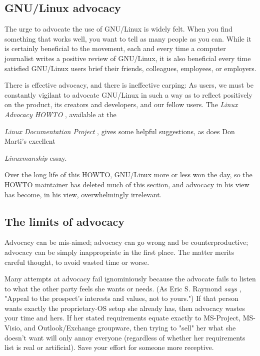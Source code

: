 \documentclass{HOWTO}
\begin{document}
\subsection{GNU/Linux advocacy}

The urge to advocate the use of GNU/Linux is widely felt.  When you find
something that works well, you want to tell as many people as you can.
While it is certainly beneficial to the movement, each and every time a
computer journalist writes a positive review of GNU/Linux, it is also
beneficial every time satisfied GNU/Linux users brief their friends,
colleagues, employees, or employers.

There is effective advocacy, and there is ineffective carping: As 
users, we must be constantly vigilant to advocate GNU/Linux in such a way as
to reflect positively on the product, its creators and developers, and
our fellow users.  The 
\emph{Linux Advocacy HOWTO} \texttt{\ackurl}
, available at the 

\emph{Linux Documentation Project} \texttt{\aclurl}
, 
gives some helpful suggestions, as does Don Marti's excellent 

\emph{Linuxmanship} \texttt{\acmurl}
 essay.

Over the long life of this HOWTO, GNU/Linux more or less won the 
day, so the HOWTO maintainer has deleted much of this section, and 
advocacy in his view has become, in his view, overwhelmingly irrelevant.




\subsection{The limits of advocacy}

Advocacy can be mis-aimed; advocacy can go wrong and be
counterproductive; advocacy can be simply inappropriate in the first
place.  The matter merits careful thought, to avoid wasted time or
worse.

Many attempts at advocacy fail ignominiously because the advocate fails
to listen to what the other party feels she wants or needs.  (As Eric
S. Raymond 
\emph{says} \texttt{\acnurl}
, 
"Appeal to the prospect's interests and values, not to
yours.") If that person wants exactly the proprietary-OS setup she
already has, then advocacy wastes your time and hers.  If her
stated requirements equate exactly to MS-Project, MS-Visio, and
Outlook/Exchange groupware, then trying to "sell" her what she doesn't
want will only annoy everyone (regardless of whether her requirements
list is real or artificial).  Save your effort for someone more
receptive.  
\end{document}

